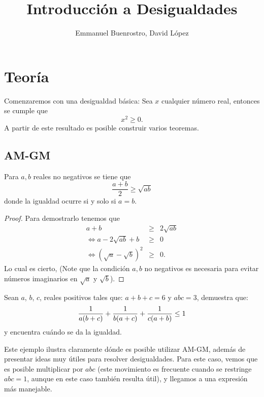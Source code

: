 \documentclass[11pt]{scrartcl}
\title {Introducci\'on a Desigualdades}
\author{Emmanuel Buenrostro, David L\'opez}
\begin{document}
\maketitle
\section{Teor\'ia}
Comenzaremos con una desigualdad b\'asica: Sea $x$ cualquier n\'umero real, entonces se cumple que
$$x^2 \geq 0.$$
A partir de este resultado es posible construir varios teoremas. 

\subsection{AM-GM}

\begin{theorem} 
Para $a,b$ reales no negativos se tiene que 
$$\frac{a+b}{2} \geq \sqrt{ab}$$
donde la igualdad ocurre si y solo si $a=b$.
\end{theorem}
\begin{proof}
Para demostrarlo tenemos que 
\begin{eqnarray*}
a+b &\geq& 2\sqrt{ab} \\
\Leftrightarrow a-2\sqrt{ab}+b &\geq& 0 \\
\Leftrightarrow (\sqrt{a}-\sqrt{b})^2 &\geq& 0.
\end{eqnarray*}
Lo cual es cierto, (Note que la condici\'on $a,b$ no negativos es necesaria para evitar n\'umeros imaginarios en $\sqrt{a}$ y $\sqrt{b}$).
\end{proof}
\begin{example}
Sean \(a\), \(b\), \(c\), reales positivos tales que: \(a+b+c=6\) y \(abc=3\), demuestra que:
$${1 \over a(b+c)}  + {1 \over b(a+c)} + {1 \over c(a+b)} \leq 1$$
y encuentra cuándo se da la igualdad.
\label{BCTST2015-5}
\end{example}
Este ejemplo ilustra claramente d\'onde es posible utilizar AM-GM, además de presentar ideas muy \'utiles para resolver desigualdades. Para este caso, vemos que es posible multiplicar por $abc$ (este movimiento es frecuente cuando se restringe $abc=1$, aunque en este caso tambi\'en resulta \'util), y llegamos a una expresi\'on m\'as manejable.
\end{document}

